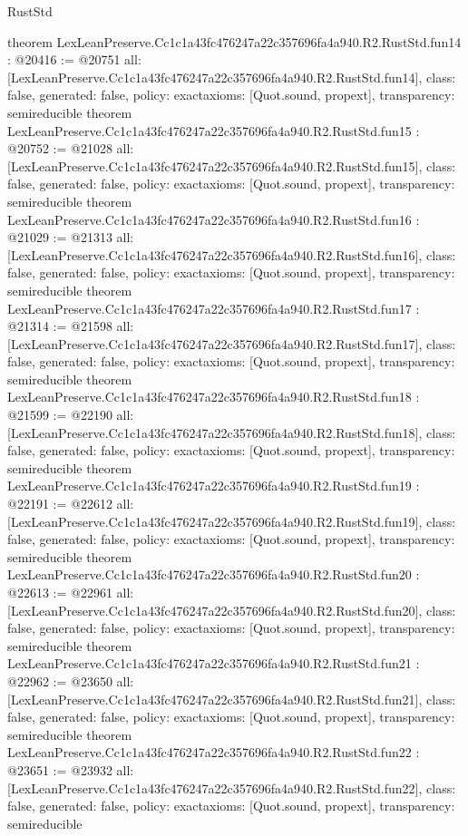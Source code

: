 \begin{lexlean}{RustStd}
\begin{coremodule}
{}
theorem LexLeanPreserve.Cc1c1a43fc476247a22c357696fa4a940.R2.RustStd.fun14 : @20416 := @20751 {
  all: [LexLeanPreserve.Cc1c1a43fc476247a22c357696fa4a940.R2.RustStd.fun14],
  class: false,
  generated: false,
  policy: exact{axioms: [Quot.sound, propext]},
  transparency: semireducible
}
theorem LexLeanPreserve.Cc1c1a43fc476247a22c357696fa4a940.R2.RustStd.fun15 : @20752 := @21028 {
  all: [LexLeanPreserve.Cc1c1a43fc476247a22c357696fa4a940.R2.RustStd.fun15],
  class: false,
  generated: false,
  policy: exact{axioms: [Quot.sound, propext]},
  transparency: semireducible
}
theorem LexLeanPreserve.Cc1c1a43fc476247a22c357696fa4a940.R2.RustStd.fun16 : @21029 := @21313 {
  all: [LexLeanPreserve.Cc1c1a43fc476247a22c357696fa4a940.R2.RustStd.fun16],
  class: false,
  generated: false,
  policy: exact{axioms: [Quot.sound, propext]},
  transparency: semireducible
}
theorem LexLeanPreserve.Cc1c1a43fc476247a22c357696fa4a940.R2.RustStd.fun17 : @21314 := @21598 {
  all: [LexLeanPreserve.Cc1c1a43fc476247a22c357696fa4a940.R2.RustStd.fun17],
  class: false,
  generated: false,
  policy: exact{axioms: [Quot.sound, propext]},
  transparency: semireducible
}
theorem LexLeanPreserve.Cc1c1a43fc476247a22c357696fa4a940.R2.RustStd.fun18 : @21599 := @22190 {
  all: [LexLeanPreserve.Cc1c1a43fc476247a22c357696fa4a940.R2.RustStd.fun18],
  class: false,
  generated: false,
  policy: exact{axioms: [Quot.sound, propext]},
  transparency: semireducible
}
theorem LexLeanPreserve.Cc1c1a43fc476247a22c357696fa4a940.R2.RustStd.fun19 : @22191 := @22612 {
  all: [LexLeanPreserve.Cc1c1a43fc476247a22c357696fa4a940.R2.RustStd.fun19],
  class: false,
  generated: false,
  policy: exact{axioms: [Quot.sound, propext]},
  transparency: semireducible
}
theorem LexLeanPreserve.Cc1c1a43fc476247a22c357696fa4a940.R2.RustStd.fun20 : @22613 := @22961 {
  all: [LexLeanPreserve.Cc1c1a43fc476247a22c357696fa4a940.R2.RustStd.fun20],
  class: false,
  generated: false,
  policy: exact{axioms: [Quot.sound, propext]},
  transparency: semireducible
}
theorem LexLeanPreserve.Cc1c1a43fc476247a22c357696fa4a940.R2.RustStd.fun21 : @22962 := @23650 {
  all: [LexLeanPreserve.Cc1c1a43fc476247a22c357696fa4a940.R2.RustStd.fun21],
  class: false,
  generated: false,
  policy: exact{axioms: [Quot.sound, propext]},
  transparency: semireducible
}
theorem LexLeanPreserve.Cc1c1a43fc476247a22c357696fa4a940.R2.RustStd.fun22 : @23651 := @23932 {
  all: [LexLeanPreserve.Cc1c1a43fc476247a22c357696fa4a940.R2.RustStd.fun22],
  class: false,
  generated: false,
  policy: exact{axioms: [Quot.sound, propext]},
  transparency: semireducible
}
\end{coremodule}
\end{lexlean}
